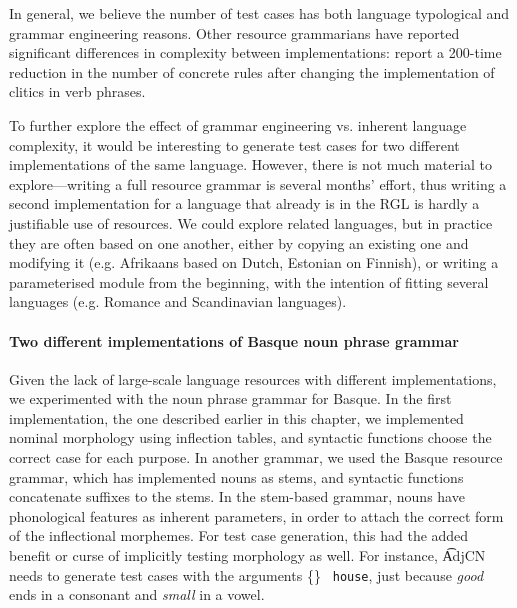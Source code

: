 In general, we believe the number of test cases has both language
typological and grammar engineering reasons. Other resource
grammarians have reported significant differences in complexity
between implementations: \citet{enache2010} report a
200-time reduction in the number of concrete rules after changing the
implementation of clitics in verb phrases.

To further explore the effect of grammar engineering vs. inherent
language complexity, it would be interesting to generate test cases
for two different implementations of the same language.  However,
there is not much material to explore---writing a full resource
grammar is several months' effort, thus writing a second
implementation for a language that already is in the RGL is hardly a
justifiable use of resources. We could explore related languages, but in
practice they are often based on one another, either by copying an
existing one and modifying it (e.g. Afrikaans based on Dutch, Estonian
on Finnish), or writing a parameterised module from the beginning,
with the intention of fitting several languages (e.g. Romance and
Scandinavian languages).


\paragraph{Two different implementations of Basque noun phrase grammar}

Given the lack of large-scale language resources with different
implementations, we experimented with the noun phrase grammar for
Basque. In the first implementation, the one described earlier in this
chapter, we implemented nominal morphology using inflection tables,
and syntactic functions choose the correct case for each purpose. In
another grammar, we used the Basque resource grammar, which has
implemented nouns as stems, and syntactic functions concatenate
suffixes to the stems.  In the stem-based grammar, nouns have
phonological features as inherent parameters, in order to attach the
correct form of the inflectional morphemes. For test case generation,
this had the added benefit or curse of implicitly testing morphology
as well. For instance, \t{AdjCN} needs to generate test cases with the
arguments \{\} {\tt
  house}, just because \emph{good} ends in a consonant and
\emph{small} in a vowel.

